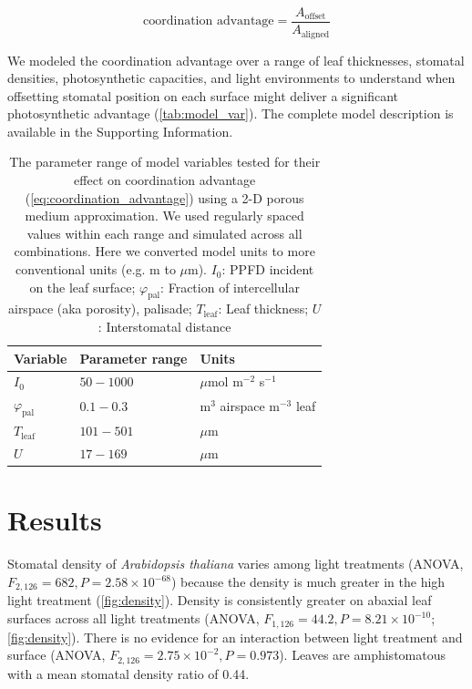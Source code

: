 \documentclass[webpdf,large,modern,unnumsec,namedate]{oup-authoring-template}
\begin{document}
\begin{equation} \label{eq:coordination_advantage}
  \text{coordination advantage} = \frac{A_\text{offset}}{A_\text{aligned}}
\end{equation}

We modeled the coordination advantage over a range of leaf thicknesses,
stomatal densities, photosynthetic capacities, and light environments to
understand when offsetting stomatal position on each surface might
deliver a significant photosynthetic advantage
(\autoref{tab:model_var}). The complete model description is available
in the Supporting Information.

\begin{table}

\caption{\label{tab:model_var}The parameter range of model variables tested for their effect on coordination advantage (\autoref{eq:coordination_advantage}) using a 2-D porous medium approximation. We used regularly spaced values within each range and simulated across all combinations. Here we converted model units to more conventional units (e.g. m to $\mu$m). $I_0$: PPFD incident on the leaf surface; $\varphi_\text{pal}$: Fraction of intercellular airspace (aka porosity), palisade; $T_\text{leaf}$: Leaf thickness; $U$: Interstomatal distance}
\centering
\begin{tabular}[t]{lll}
\toprule
Variable & Parameter range & Units\\
\midrule
$I_0$ & $50-1000$ & $\mu$mol m$^{-2}$ s$^{-1}$\\
$\varphi_\text{pal}$ & $0.1-0.3$ & m$^3$ airspace m$^{-3}$ leaf\\
$T_\text{leaf}$ & $101-501$ & $\mu$m\\
$U$ & $17-169$ & $\mu$m\\
\bottomrule
\end{tabular}
\end{table}

\section{Results}\label{results}

Stomatal density of \emph{Arabidopsis thaliana} varies among light
treatments (ANOVA, \(F_{2,126} = 682, P = 2.58 \times 10^{-68}\))
because the density is much greater in the high light treatment
(\autoref{fig:density}). Density is consistently greater on abaxial leaf
surfaces across all light treatments (ANOVA,
\(F_{1,126} = 44.2, P = 8.21 \times 10^{-10}\); \autoref{fig:density}).
There is no evidence for an interaction between light treatment and
surface (ANOVA, \(F_{2,126} = 2.75 \times 10^{-2}, P = 0.973\)). Leaves
are amphistomatous with a mean stomatal density ratio of 0.44.
\end{document}
